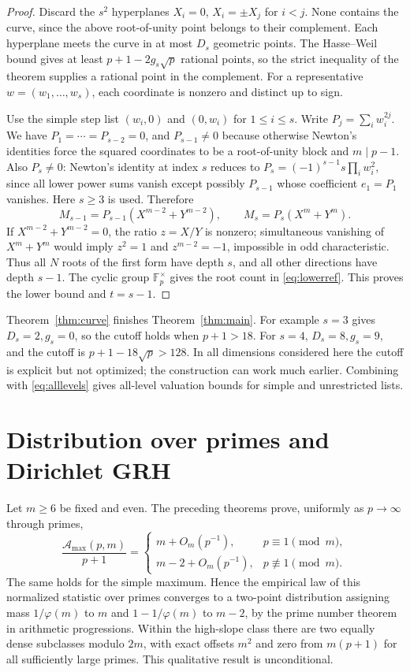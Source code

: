 \documentclass[11pt]{article}
\theoremstyle{remark}\newtheorem{remark}[theorem]{Remark}
\newcommand{\F}{\mathbb F}
\newcommand{\A}{\mathcal A}
\begin{document}
\begin{proof}
Discard the $s^2$ hyperplanes $X_i=0$, $X_i=\pm X_j$ for $i<j$. None contains the curve, since the above root-of-unity point belongs to their complement. Each hyperplane meets the curve in at most $D_s$ geometric points. The Hasse--Weil bound \cite{weil} gives at least $p+1-2g_s\sqrt p$ rational points, so the strict inequality of the theorem supplies a rational point in the complement. For a representative $w=(w_1,\ldots,w_s)$, each coordinate is nonzero and distinct up to sign.

Use the simple step list $(w_i,0)$ and $(0,w_i)$ for $1\le i\le s$. Write $P_j=\sum_i w_i^{2j}$. We have $P_1=\cdots=P_{s-2}=0$, and $P_{s-1}\ne0$ because otherwise Newton's identities force the squared coordinates to be a root-of-unity block and $m\mid p-1$. Also $P_s\ne0$: Newton's identity at index $s$ reduces to $P_s=(-1)^{s-1}s\prod_i w_i^2$, since all lower power sums vanish except possibly $P_{s-1}$ whose coefficient $e_1=P_1$ vanishes. Here $s\ge3$ is used. Therefore
\[
 M_{s-1}=P_{s-1}(X^{m-2}+Y^{m-2}),\qquad M_s=P_s(X^m+Y^m).
\]
If $X^{m-2}+Y^{m-2}=0$, the ratio $z=X/Y$ is nonzero; simultaneous vanishing of $X^m+Y^m$ would imply $z^2=1$ and $z^{m-2}=-1$, impossible in odd characteristic. Thus all $N$ roots of the first form have depth $s$, and all other directions have depth $s-1$. The cyclic group $\F_p^\times$ gives the root count in \eqref{eq:lowerref}. This proves the lower bound and $t=s-1$.
\end{proof}

Theorem~\ref{thm:curve} finishes Theorem~\ref{thm:main}. For example $s=3$ gives $D_s=2,g_s=0$, so the cutoff holds when $p+1>18$. For $s=4$, $D_s=8,g_s=9$, and the cutoff is $p+1-18\sqrt p>128$. In all dimensions considered here the cutoff is explicit but not optimized; the construction can work much earlier. Combining with \eqref{eq:alllevels} gives all-level valuation bounds for simple and unrestricted lists.

\section{Distribution over primes and Dirichlet GRH}\label{sec:dgrh}
Let $m\ge6$ be fixed and even. The preceding theorems prove, uniformly as $p\to\infty$ through primes,
\begin{equation}\label{eq:slope}
 \frac{\A_{\max}(p,m)}{p+1}=
 \begin{cases}m+O_m(p^{-1}),&p\equiv1\pmod m,\\m-2+O_m(p^{-1}),&p\not\equiv1\pmod m.\end{cases}
\end{equation}
The same holds for the simple maximum. Hence the empirical law of this normalized statistic over primes converges to a two-point distribution assigning mass $1/\varphi(m)$ to $m$ and $1-1/\varphi(m)$ to $m-2$, by the prime number theorem in arithmetic progressions. Within the high-slope class there are two equally dense subclasses modulo $2m$, with exact offsets $m^2$ and zero from $m(p+1)$ for all sufficiently large primes. This qualitative result is unconditional.
\end{document}
